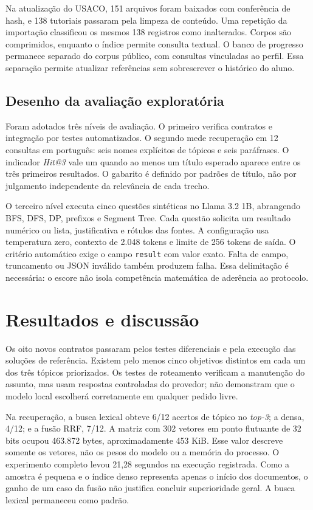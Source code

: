 \documentclass[12pt]{article}
\begin{document}
Na atualização do USACO, 151 arquivos foram baixados com conferência de hash, e 138 tutoriais passaram pela limpeza de conteúdo. Uma repetição da importação classificou os mesmos 138 registros como inalterados. Corpos são comprimidos, enquanto o índice permite consulta textual. O banco de progresso permanece separado do corpus público, com consultas vinculadas ao perfil. Essa separação permite atualizar referências sem sobrescrever o histórico do aluno.

\subsection{Desenho da avaliação exploratória}
Foram adotados três níveis de avaliação. O primeiro verifica contratos e integração por testes automatizados. O segundo mede recuperação em 12 consultas em português: seis nomes explícitos de tópicos e seis paráfrases. O indicador \emph{Hit@3} vale um quando ao menos um título esperado aparece entre os três primeiros resultados. O gabarito é definido por padrões de título, não por julgamento independente da relevância de cada trecho.

O terceiro nível executa cinco questões sintéticas no Llama 3.2 1B, abrangendo BFS, DFS, DP, prefixos e Segment Tree. Cada questão solicita um resultado numérico ou lista, justificativa e rótulos das fontes. A configuração usa temperatura zero, contexto de 2.048 tokens e limite de 256 tokens de saída. O critério automático exige o campo \texttt{result} com valor exato. Falta de campo, truncamento ou JSON inválido também produzem falha. Essa delimitação é necessária: o escore não isola competência matemática de aderência ao protocolo.

\section{Resultados e discussão}
Os oito novos contratos passaram pelos testes diferenciais e pela execução das soluções de referência. Existem pelo menos cinco objetivos distintos em cada um dos três tópicos priorizados. Os testes de roteamento verificam a manutenção do assunto, mas usam respostas controladas do provedor; não demonstram que o modelo local escolherá corretamente em qualquer pedido livre.

Na recuperação, a busca lexical obteve 6/12 acertos de tópico no \emph{top-3}; a densa, 4/12; e a fusão RRF, 7/12. A matriz com 302 vetores em ponto flutuante de 32 bits ocupou 463.872 bytes, aproximadamente 453 KiB. Esse valor descreve somente os vetores, não os pesos do modelo ou a memória do processo. O experimento completo levou 21,28 segundos na execução registrada. Como a amostra é pequena e o índice denso representa apenas o início dos documentos, o ganho de um caso da fusão não justifica concluir superioridade geral. A busca lexical permaneceu como padrão.
\end{document}

